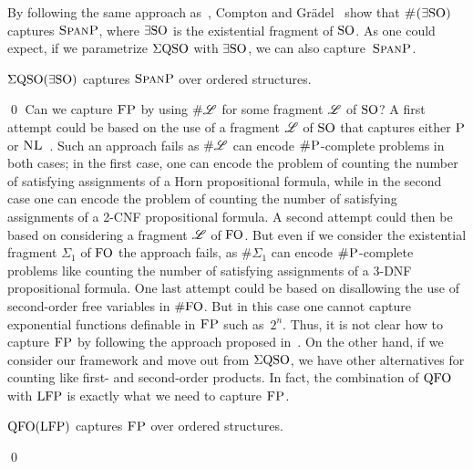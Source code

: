 By following the same approach as~\cite{SalujaST95}, Compton and Gr\"adel~\cite{ComptonG96} show that $\text{\sc \#($\exists{\rm SO}$)}$ captures $\text{\sc SpanP}$, where $\exists{\rm SO}$ is the existential fragment of ${\rm SO}$. As one could expect, if we parametrize $\Sigma{\rm QSO}$ with $\exists{\rm SO}$, we can also capture~$\text{\sc SpanP}$.
\begin{prop} \label{prop:capture-spanP}
	$\Sigma{\rm QSO}(\exists{\rm SO})$ captures $\text{\sc SpanP}$ over ordered structures.
\end{prop}
\proof

\qed
Can we capture $\text{\sc FP}$ by using $\# \mathscr{L}$ for some fragment $\mathscr{L}$ of ${\rm SO}$? A first attempt could be based on the use of a fragment $\mathscr{L}$ of ${\rm SO}$ that captures either $\text{\sc P}$ or $\text{\sc NL}$~\cite{G92}. Such an approach fails as $\# \mathscr{L}$ can encode $\text{\sc \#P}$-complete problems in both cases; in the first case, one can encode the problem of counting the number of satisfying assignments of a Horn  propositional formula, while in the second case one can encode the problem of counting the number of satisfying assignments of a 2-CNF propositional formula. A second attempt could then be based on considering a fragment $\mathscr{L}$ of ${\rm FO}$. 
But even if we consider the existential fragment $\Sigma_1$ of ${\rm FO}$ the approach fails, as $\# \Sigma_1$ can encode $\text{\sc \#P}$-complete problems like counting the number of satisfying assignments of a 3-DNF propositional formula\cite{SalujaST95}. One last attempt could be based on disallowing the use of second-order free variables in $\#{\rm FO}$. But in this case one 
cannot capture exponential functions definable in $\text{\sc FP}$ such as~$2^n$.
Thus, it is not clear how to capture $\text{\sc FP}$ 
by following the approach proposed in~\cite{SalujaST95}. 
On the other hand, if we consider our framework and move out from $\Sigma{\rm QSO}$, we have other alternatives for counting like first- and second-order products. In fact, the combination of ${\rm QFO}$ with ${\rm LFP}$ is exactly what we need to capture $\text{\sc FP}$.
\begin{thm} \label{theo:capture-fp}
	${\rm QFO}({\rm LFP})$ captures $\text{\sc FP}$ over ordered structures.
\end{thm}
\proof

\qed

